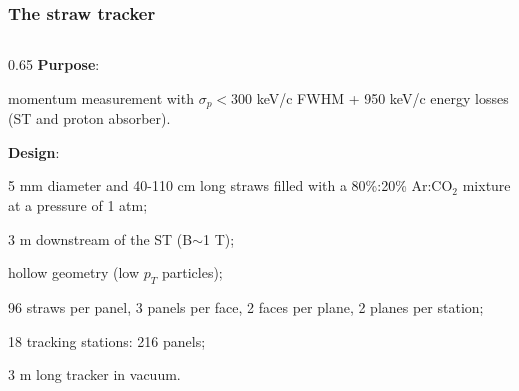\documentclass{beamer}
\begin{document}
\begin{frame}
    \frametitle{The straw tracker}
    \begin{columns}
    \begin{column}{0.65 \framewidth}
{\footnotesize \textbf{Purpose}:}
\vspace{0.5mm}
\begin{itemize}
    {\footnotesize \item momentum measurement with $\sigma_p<300$ keV/c FWHM + 950 keV/c energy losses (ST and proton absorber). }
    \vspace{2mm}
\end{itemize}
{\footnotesize \textbf{Design}:}
\vspace{1mm}
\begin{itemize}
    {\footnotesize
    \item 5 mm diameter and 40-110 cm long straws filled with a 80\%:20\% Ar:CO$_2$ mixture at a pressure of 1 atm;
    \vspace{2mm}
    \item 3 m downstream of the ST (B$\sim$1 T);
    \vspace{2mm}
    \item hollow geometry (low $p_T$ particles);
    \vspace{2mm}
    \item 96 straws per panel, 3 panels per face, 2 faces per plane, 2 planes per station;
    \vspace{2mm}
        \item 18 tracking stations: 216 panels;
        \vspace{2mm}
        \item 3 m long tracker in vacuum.}
       
        
        
    \end{itemize}
    

\end{column}
\end{columns}
\end{frame}
\end{document}
